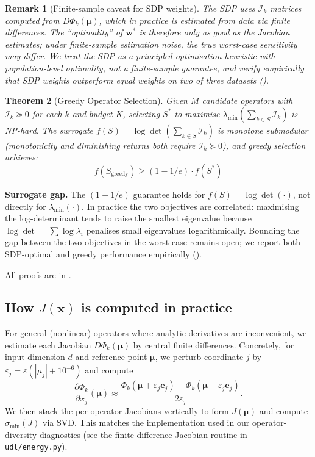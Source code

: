 \documentclass{article}
\newtheorem{theorem}{Theorem}
\newtheorem{remark}[theorem]{Remark}
\newcommand{\abs}[1]{\left\lvert#1\right\rvert}
\begin{document}
\begin{remark}[Finite-sample caveat for SDP weights]
\label{rem:sdp_estimation}
The SDP uses $\mathcal{I}_k$ matrices computed from $D\Phi_k(\bm{\mu})$, which in practice is estimated from data via finite differences. The ``optimality'' of $\mathbf{w}^*$ is therefore only as good as the Jacobian estimates; under finite-sample estimation noise, the true worst-case sensitivity may differ. We treat the SDP as a principled optimisation heuristic with population-level optimality, not a finite-sample guarantee, and verify empirically that SDP weights outperform equal weights on two of three datasets ().
\end{remark}

\begin{theorem}[Greedy Operator Selection]
\label{thm:greedy}
Given $M$ candidate operators with $\mathcal{I}_k \succeq 0$ for each $k$ and budget $K$, selecting $S^*$ to maximise $\lambda_{\min}(\sum_{k \in S} \mathcal{I}_k)$ is NP-hard. The surrogate $f(S) = \log\det(\sum_{k \in S} \mathcal{I}_k)$ is monotone submodular (monotonicity and diminishing returns both require $\mathcal{I}_k \succeq 0$), and greedy selection achieves:
\begin{equation}
f(S_{\text{greedy}}) \geq (1 - 1/e) \cdot f(S^*)
\end{equation}
\end{theorem}

\textbf{Surrogate gap.} The $(1-1/e)$ guarantee holds for $f(S) = \log\det(\cdot)$, not directly for $\lambda_{\min}(\cdot)$. In practice the two objectives are correlated: maximising the log-determinant tends to raise the smallest eigenvalue because $\log\det = \sum \log\lambda_i$ penalises small eigenvalues logarithmically. Bounding the gap between the two objectives in the worst case remains open; we report both SDP-optimal and greedy performance empirically ().

All proofs are in .

\subsection{How $J(\mathbf{x})$ is computed in practice}
\label{ssec:jacobian_practice}
For general (nonlinear) operators where analytic derivatives are inconvenient, we estimate each Jacobian $D\Phi_k(\bm{\mu})$ by central finite differences. Concretely, for input dimension $d$ and reference point $\bm{\mu}$, we perturb coordinate $j$ by $\varepsilon_j=\varepsilon(\abs{\mu_j}+10^{-6})$ and compute
\begin{equation}
\frac{\partial \Phi_k}{\partial x_j}(\bm{\mu}) \approx \frac{\Phi_k(\bm{\mu}+\varepsilon_j\mathbf{e}_j)-\Phi_k(\bm{\mu}-\varepsilon_j\mathbf{e}_j)}{2\varepsilon_j}.
\end{equation}
We then stack the per-operator Jacobians vertically to form $J(\bm{\mu})$ and compute $\sigma_{\min}(J)$ via SVD. This matches the implementation used in our operator-diversity diagnostics (see the finite-difference Jacobian routine in \texttt{udl/energy.py}).
\end{document}
